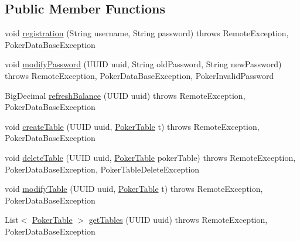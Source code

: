 \subsection*{Public Member Functions}
\begin{DoxyCompactItemize}
\item 
void \hyperlink{interfacehu_1_1elte_1_1bfw1p6_1_1poker_1_1rmi_1_1_poker_remote_a3d1df70e28b2f363c870eddad8ec2b9f}{registration} (String username, String password)  throws Remote\+Exception, Poker\+Data\+Base\+Exception
\item 
void \hyperlink{interfacehu_1_1elte_1_1bfw1p6_1_1poker_1_1rmi_1_1_poker_remote_a06fbc74304b4d1b1195c70dcd65c5064}{modify\+Password} (U\+U\+I\+D uuid, String old\+Password, String new\+Password)  throws Remote\+Exception, Poker\+Data\+Base\+Exception, Poker\+Invalid\+Password
\item 
Big\+Decimal \hyperlink{interfacehu_1_1elte_1_1bfw1p6_1_1poker_1_1rmi_1_1_poker_remote_aaada5bb71e267ec556180050ad49bc84}{refresh\+Balance} (U\+U\+I\+D uuid)  throws Remote\+Exception, Poker\+Data\+Base\+Exception
\item 
void \hyperlink{interfacehu_1_1elte_1_1bfw1p6_1_1poker_1_1rmi_1_1_poker_remote_a0f08e6b6927391252bd5362ab0c55b27}{create\+Table} (U\+U\+I\+D uuid, \hyperlink{classhu_1_1elte_1_1bfw1p6_1_1poker_1_1model_1_1entity_1_1_poker_table}{Poker\+Table} t)  throws Remote\+Exception, Poker\+Data\+Base\+Exception
\item 
void \hyperlink{interfacehu_1_1elte_1_1bfw1p6_1_1poker_1_1rmi_1_1_poker_remote_a8ea0638689f4ff485260cfcb399c62c8}{delete\+Table} (U\+U\+I\+D uuid, \hyperlink{classhu_1_1elte_1_1bfw1p6_1_1poker_1_1model_1_1entity_1_1_poker_table}{Poker\+Table} poker\+Table)  throws Remote\+Exception, Poker\+Data\+Base\+Exception, Poker\+Table\+Delete\+Exception
\item 
void \hyperlink{interfacehu_1_1elte_1_1bfw1p6_1_1poker_1_1rmi_1_1_poker_remote_a572c16ac86bc86a008f89ff240f708ae}{modify\+Table} (U\+U\+I\+D uuid, \hyperlink{classhu_1_1elte_1_1bfw1p6_1_1poker_1_1model_1_1entity_1_1_poker_table}{Poker\+Table} t)  throws Remote\+Exception, Poker\+Data\+Base\+Exception
\item 
List$<$ \hyperlink{classhu_1_1elte_1_1bfw1p6_1_1poker_1_1model_1_1entity_1_1_poker_table}{Poker\+Table} $>$ \hyperlink{interfacehu_1_1elte_1_1bfw1p6_1_1poker_1_1rmi_1_1_poker_remote_aed57bb8183c47f8a2fb2a5f9772143ac}{get\+Tables} (U\+U\+I\+D uuid)  throws Remote\+Exception, Poker\+Data\+Base\+Exception
\item 

\end{DoxyCompactItemize}
